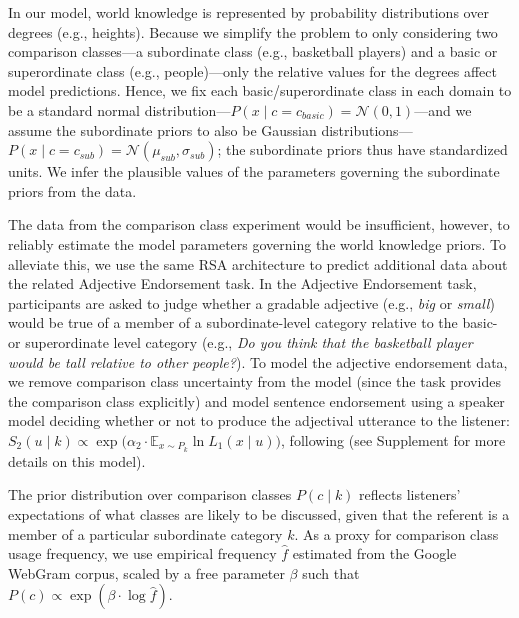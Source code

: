 \documentclass[doc]{apa6}
\begin{document}
In our model, world knowledge is represented by probability distributions over degrees (e.g., heights).
Because we simplify the problem to only considering two comparison classes---a subordinate class (e.g., basketball players) and a basic or superordinate class (e.g., people)---only the relative values for the degrees affect model predictions. 
Hence, we fix each basic/superordinate class in each domain to be a standard normal distribution---$P(x \mid c = c_{basic}) = \mathcal{N}(0, 1)$---and we assume the subordinate priors to also be Gaussian distributions---\(P(x \mid c = c_{sub}) = \mathcal{N}(\mu_{sub}, \sigma_{sub})\); the subordinate priors thus have standardized units.
We infer the plausible values of the parameters governing the subordinate priors from the data.

The data from the comparison class experiment would be insufficient, however, to reliably estimate the model parameters governing the world knowledge priors. 
To alleviate this, we use the same RSA architecture to predict additional data about the related Adjective Endorsement task. 
In the Adjective Endorsement task, participants are asked to judge whether a gradable adjective (e.g., \emph{big} or \emph{small}) would be true of a member of a subordinate-level category relative to the basic- or superordinate level category (e.g., \emph{Do you think that the basketball player would be tall relative to other people?}).
To model the adjective endorsement data, we remove comparison class uncertainty from the model (since the task provides the comparison class explicitly) and model sentence endorsement using a speaker model deciding whether or not to produce the adjectival utterance to the listener: $S_{2}(u \mid k) \propto \exp{(\alpha_2 \cdot {\mathbb E}_{x\sim P_{k}}} \ln{L_1(x \mid u)})$, following  (see Supplement for more details on this model). 

The prior distribution over comparison classes $P(c \mid k)$ reflects listeners' expectations of what classes are likely to be discussed, given that the referent is a member of a particular subordinate category $k$. 
As a proxy for comparison class usage frequency, we use empirical frequency \(\hat{f}\) estimated from the Google WebGram corpus, scaled by a free parameter $\beta$ such that $P(c) \propto \exp{(\beta \cdot \log \hat{f})}$.
\end{document}
